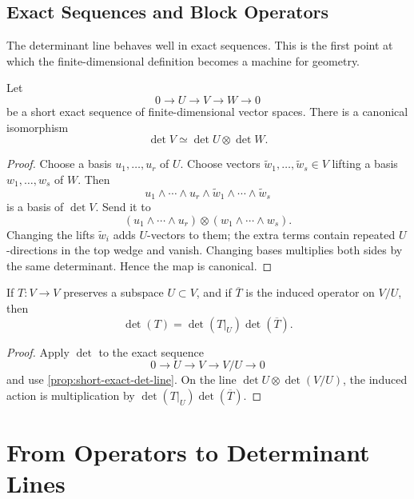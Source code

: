 \documentclass[11pt]{memoir}
\providecommand{\Cref}[1]{\ref{#1}}
\begin{document}
\section{Exact Sequences and Block Operators}
\label{sec:exact-sequences}

The determinant line behaves well in exact sequences. This is the
first point at which the finite-dimensional definition becomes a
machine for geometry.

\begin{proposition}
\label{prop:short-exact-det-line}
Let
\[
  0\longrightarrow U\longrightarrow V\longrightarrow W\longrightarrow 0
\]
be a short exact sequence of finite-dimensional vector spaces. There
is a canonical isomorphism
\[
  \det V\simeq \det U\otimes \det W.
\]
\end{proposition}

\begin{proof}
Choose a basis \(u_1,\dots,u_r\) of \(U\). Choose vectors
\(\widetilde w_1,\dots,\widetilde w_s\in V\) lifting a basis
\(w_1,\dots,w_s\) of \(W\). Then
\[
  u_1\wedge\cdots\wedge u_r\wedge
  \widetilde w_1\wedge\cdots\wedge \widetilde w_s
\]
is a basis of \(\det V\). Send it to
\[
  (u_1\wedge\cdots\wedge u_r)\otimes
  (w_1\wedge\cdots\wedge w_s).
\]
Changing the lifts \(\widetilde w_i\) adds \(U\)-vectors to them; the
extra terms contain repeated \(U\)-directions in the top wedge and
vanish. Changing bases multiplies both sides by the same determinant.
Hence the map is canonical.
\end{proof}

\begin{corollary}
\label{cor:block-triangular}
If \(T:V\to V\) preserves a subspace \(U\subset V\), and if
\(\overline T\) is the induced operator on \(V/U\), then
\[
  \det(T)=\det(T|_U)\det(\overline T).
\]
\end{corollary}

\begin{proof}
Apply \(\det\) to the exact sequence
\[
  0\to U\to V\to V/U\to 0
\]
and use \Cref{prop:short-exact-det-line}. On the line
\(\det U\otimes\det(V/U)\), the induced action is multiplication by
\(\det(T|_U)\det(\overline T)\).
\end{proof}

\chapter{From Operators to Determinant Lines}
\label{ch:det-lines}
\end{document}
